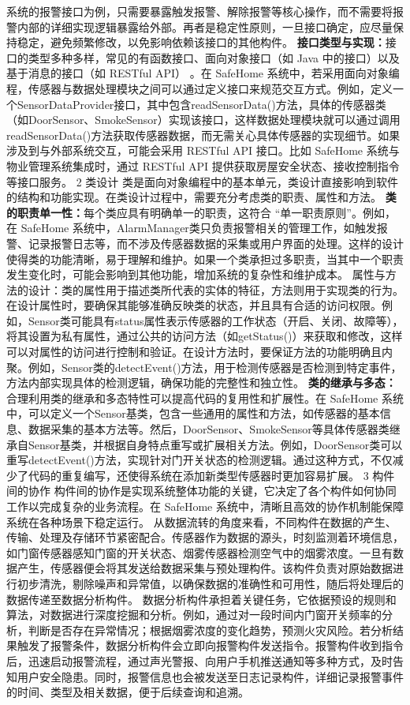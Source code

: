 {{{{系统的报警接口为例，只需要暴露触发报警、解除报警等核心操作，而不需要将报警内部的详细实现逻辑暴露给外部。再者是稳定性原则，一旦接口确定，应尽量保持稳定，避免频繁修改，以免影响依赖该接口的其他构件。 \textbf{接口类型与实现：}接口的类型多种多样，常见的有函数接口、面向对象接口（如 Java 中的接口）以及基于消息的接口（如 RESTful API） 。在 SafeHome 系统中，若采用面向对象编程，传感器与数据处理模块之间可以通过定义接口来规范交互方式。例如，定义一个SensorDataProvider接口，其中包含readSensorData()方法，具体的传感器类（如DoorSensor、SmokeSensor）实现该接口，这样数据处理模块就可以通过调用readSensorData()方法获取传感器数据，而无需关心具体传感器的实现细节。如果涉及到与外部系统交互，可能会采用 RESTful API 接口。比如 SafeHome 系统与物业管理系统集成时，通过 RESTful API 提供获取房屋安全状态、接收控制指令等接口服务。 2 类设计 类是面向对象编程中的基本单元，类设计直接影响到软件的结构和功能实现。在类设计过程中，需要充分考虑类的职责、属性和方法。 \textbf{类的职责单一性：}每个类应具有明确单一的职责，这符合 ``单一职责原则''。例如，在 SafeHome 系统中，AlarmManager类只负责报警相关的管理工作，如触发报警、记录报警日志等，而不涉及传感器数据的采集或用户界面的处理。这样的设计使得类的功能清晰，易于理解和维护。如果一个类承担过多职责，当其中一个职责发生变化时，可能会影响到其他功能，增加系统的复杂性和维护成本。 属性与方法的设计：类的属性用于描述类所代表的实体的特征，方法则用于实现类的行为。在设计属性时，要确保其能够准确反映类的状态，并且具有合适的访问权限。例如，Sensor类可能具有status属性表示传感器的工作状态（开启、关闭、故障等），将其设置为私有属性，通过公共的访问方法（如getStatus()）来获取和修改，这样可以对属性的访问进行控制和验证。在设计方法时，要保证方法的功能明确且内聚。例如，Sensor类的detectEvent()方法，用于检测传感器是否检测到特定事件，方法内部实现具体的检测逻辑，确保功能的完整性和独立性。 \textbf{类的继承与多态：}合理利用类的继承和多态特性可以提高代码的复用性和扩展性。在 SafeHome 系统中，可以定义一个Sensor基类，包含一些通用的属性和方法，如传感器的基本信息、数据采集的基本方法等。然后，DoorSensor、SmokeSensor等具体传感器类继承自Sensor基类，并根据自身特点重写或扩展相关方法。例如，DoorSensor类可以重写detectEvent()方法，实现针对门开关状态的检测逻辑。通过这种方式，不仅减少了代码的重复编写，还使得系统在添加新类型传感器时更加容易扩展。 3 构件间的协作 构件间的协作是实现系统整体功能的关键，它决定了各个构件如何协同工作以完成复杂的业务流程。在 SafeHome 系统中，清晰且高效的协作机制能保障系统在各种场景下稳定运行。 从数据流转的角度来看，不同构件在数据的产生、传输、处理及存储环节紧密配合。传感器作为数据的源头，时刻监测着环境信息，如门窗传感器感知门窗的开关状态、烟雾传感器检测空气中的烟雾浓度。一旦有数据产生，传感器便会将其发送给数据采集与预处理构件。该构件负责对原始数据进行初步清洗，剔除噪声和异常值，以确保数据的准确性和可用性，随后将处理后的数据传递至数据分析构件。 数据分析构件承担着关键任务，它依据预设的规则和算法，对数据进行深度挖掘和分析。例如，通过对一段时间内门窗开关频率的分析，判断是否存在异常情况；根据烟雾浓度的变化趋势，预测火灾风险。若分析结果触发了报警条件，数据分析构件会立即向报警构件发送指令。报警构件收到指令后，迅速启动报警流程，通过声光警报、向用户手机推送通知等多种方式，及时告知用户安全隐患。同时，报警信息也会被发送至日志记录构件，详细记录报警事件的时间、类型及相关数据，便于后续查询和追溯。 }}}}
